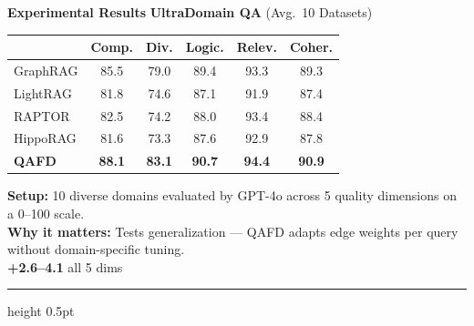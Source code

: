 \documentclass[final]{beamer}
\newlength{\colC}\setlength{\colC}{0.26\paperwidth}   %
\begin{document}
\begin{frame}[t]
\begin{columns}[t]
\begin{column}{\colC}
\begin{block}{\Large\textbf{\color{samsungblue} Experimental Results}}
\textbf{\large\color{samsungblue} UltraDomain QA} {\small(Avg.\ 10 Datasets)}\par\vspace{0.3em}
\begin{table}
\vspace{-0.8em}
\scriptsize
\begin{tabular}{l ccccc}
  \toprule
  & \textbf{Comp.} & \textbf{Div.} & \textbf{Logic.} & \textbf{Relev.} & \textbf{Coher.} \\
  \midrule
  GraphRAG  & 85.5 & 79.0 & 89.4 & 93.3 & 89.3 \\
  LightRAG  & 81.8 & 74.6 & 87.1 & 91.9 & 87.4 \\
  RAPTOR    & 82.5 & 74.2 & 88.0 & 93.4 & 88.4 \\
  HippoRAG & 81.6 & 73.3 & 87.6 & 92.9 & 87.8 \\
  \midrule
  \textbf{QAFD} & \textbf{88.1} & \textbf{83.1} & \textbf{90.7} & \textbf{94.4} & \textbf{90.9} \\
  \bottomrule
\end{tabular}
\vspace{-0.8em}
\end{table}
\noindent\scriptsize
\textbf{Setup:} 10 diverse domains evaluated by GPT-4o across 5 quality dimensions on a 0--100 scale.\\[3pt]
\textbf{Why it matters:} Tests generalization --- QAFD adapts edge weights per query without domain-specific tuning.\\[3pt]
\colorbox{accentgreen!15}{\textcolor{accentgreen}{\textbf{+2.6--4.1}} all 5 dims}\par
\vspace{0.5em}
{\color{samsungblue!30}\hrule height 0.5pt}
\vspace{0.5em}


\end{block}
\end{column}
\end{columns}
\end{frame}
\end{document}
